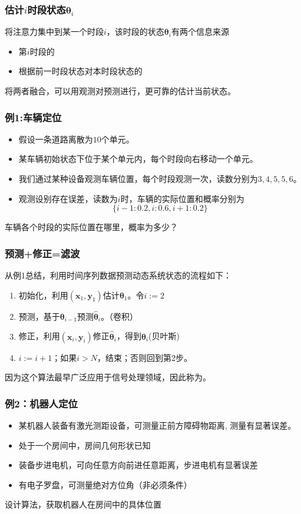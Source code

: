 \documentclass[14pt]{beamer}
\renewcommand{\vec}[1]{\bm{#1}}
\newcommand{\Vy}{\vec{y}}
\newcommand{\Vx}{\vec{x}}
\newcommand{\Vt}{\vec{\theta}}
\let\emph\relax %
\begin{document}
\begin{frame}
  \frametitle{估计$i$时段状态$\Vt_i$}
  将注意力集中到某一个时段$i$，该时段的状态$\Vt_i$有两个信息来源
  \begin{itemize}
    \item 第$i$时段的\emph{观测}
    \item 根据前一时段状态对本时段状态的\emph{预测}
  \end{itemize}
  将两者融合，可以用观测对预测进行\emph{修正}，更可靠的估计当前状态。
\end{frame}

\begin{frame}
  \frametitle{例1:车辆定位}
  \begin{itemize}
    \item 假设一条道路离散为$10$个单元。
    \item 某车辆初始状态下位于某个单元内，每个时段向右移动一个单元。
    \item 我们通过某种设备观测车辆位置，每个时段观测一次，读数分别为${3,4,5,5,6}$。
    \item 观测设别存在误差，读数为$i$时，车辆的实际位置和概率分别为
    $$\{i-1:0.2,i:0.6,i+1:0.2\}$$
  \end{itemize}

  车辆各个时段的实际位置在哪里，概率为多少？
\end{frame}

\begin{frame}
  \frametitle{预测+修正=滤波}
  从例1总结，利用时间序列数据预测动态系统状态的流程如下：
  \begin{enumerate}
    \item 初始化，利用$(\Vx_1,\Vy_1)$估计$\Vt_1$。令$i:=2$
    \item 预测，基于$\Vt_{i-1}$预测$\hat{\Vt}_i$。（卷积）
    \item 修正，利用$(\Vx_i,\Vy_i)$修正$\hat{\Vt}_i$，得到$\Vt_i$(贝叶斯)
    \item $i:=i+1$；如果$i>N$，结束；否则回到第2步。
  \end{enumerate}

  因为这个算法最早广泛应用于信号处理领域，因此称为\emph{滤波算法}。
\end{frame}

\begin{frame}
  \frametitle{例2：机器人定位}
  \begin{itemize}
    \item 某机器人装备有激光测距设备，可测量正前方障碍物距离, 测量有显著误差。
    \item 处于一个房间中，房间几何形状已知
    \item 装备步进电机，可向任意方向前进任意距离，步进电机有显著误差
    \item 有电子罗盘，可测量绝对方位角（非必须条件）
  \end{itemize}
  设计算法，获取机器人在房间中的具体位置
\end{frame}
\end{document}
